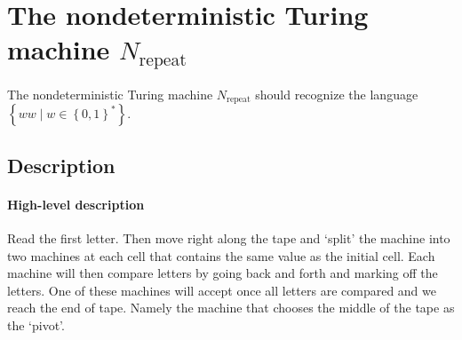 \section{The nondeterministic Turing machine $N_\text{repeat}$}

The nondeterministic Turing machine $N_\text{repeat}$ should recognize the language $\left\{ w w \mid w \in \left\{0,1\right\}^* \right\}$.

\subsection{Description}

\paragraph{High-level description}

Read the first letter. Then move right along the tape and `split' the machine into two machines at each cell that contains the same value as the initial cell. Each machine will then compare letters by going back and forth and marking off the letters. One of these machines will accept once all letters are compared and we reach the end of tape. Namely the machine that chooses the middle of the tape as the `pivot'.
